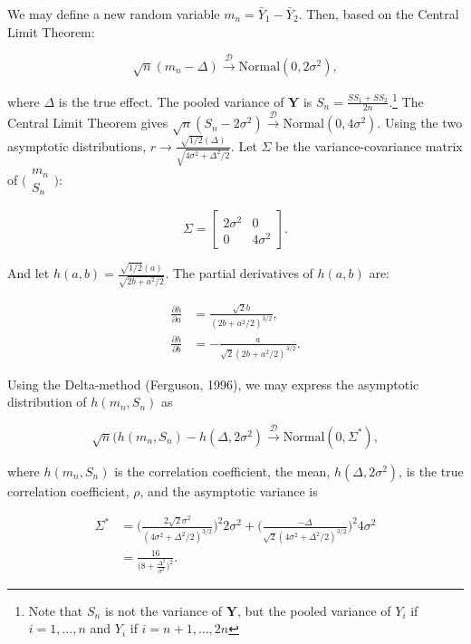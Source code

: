 \documentclass[english,,man]{apa6}
\begin{document}
We may define a new random variable \(m_n = \bar{Y}_1 - \bar{Y}_2\). Then, based on the Central Limit Theorem:

\[\sqrt{n}(m_n - \Delta) \stackrel{\mathscr{D}}{\rightarrow} \mbox{Normal}(0, 2 \sigma^2),\]

where \(\Delta\) is the true effect. The pooled variance of \(\mathbf{Y}\) is \(S_n = \frac{SS_1 + SS_2}{2n}\).\footnote{Note that \(S_n\) is not the variance of \(\mathbf{Y}\), but the pooled variance of \(Y_i\) if \(i = 1, \ldots, n\) and \(Y_i\) if \(i = n + 1, \ldots, 2n\)} The Central Limit Theorem gives \(\sqrt{n}(S_n - 2\sigma^2) \stackrel{\mathscr{D}}{\rightarrow} \mbox{Normal}(0, 4\sigma^2)\). Using the two asymptotic distributions, \(r \rightarrow \frac{\sqrt{1/2}(\Delta)}{\sqrt{4\sigma^2 + \Delta^2/2}}\). Let \(\Sigma\) be the variance-covariance matrix of \(\big(\begin{smallmatrix} m_n\\ S_n \end{smallmatrix}\big)\):

\[\Sigma = 
\begin{bmatrix}
2\sigma^2 & 0\\
0 & 4\sigma^2
\end{bmatrix}.
\]

And let \(h(a, b) = \frac{\sqrt{1/2}(a)}{\sqrt{2b + a^2/2}}\). The partial derivatives of \(h(a, b)\) are:

\begin{align*}
\frac{\partial h}{\partial a} &= \frac{\sqrt{2} b}{(2b + a^2/2)^{3/2}},\\
\frac{\partial h}{\partial b} &= -\frac{a}{\sqrt{2}(2b + a^2/2)^{3/2}}.
\end{align*}

Using the Delta-method (Ferguson, 1996), we may express the asymptotic distribution of \(h(m_n, S_n)\) as

\[\sqrt{n}(h(m_n, S_n) - h(\Delta, 2\sigma^2) \stackrel{\mathscr{D}}{\rightarrow} \mbox{Normal}(0, \Sigma^*),\]

where \(h(m_n, S_n)\) is the correlation coefficient, the mean, \(h(\Delta, 2\sigma^2)\), is the true correlation coefficient, \(\rho\), and the asymptotic variance is

\begin{align*}
\Sigma^* &= \Big(\frac{2\sqrt{2} \sigma^2}{(4\sigma^2 + \Delta^2/2)^{3/2}}\Big)^2 2\sigma^2 + \Big(\frac{- \Delta}{\sqrt{2}(4\sigma^2 + \Delta^2/2)^{3/2}}\Big)^2 4\sigma^2 \\
&= \frac{16}{\big(8 + \frac{\Delta^2}{\sigma^2}\big)^2}.
\end{align*}
\end{document}
